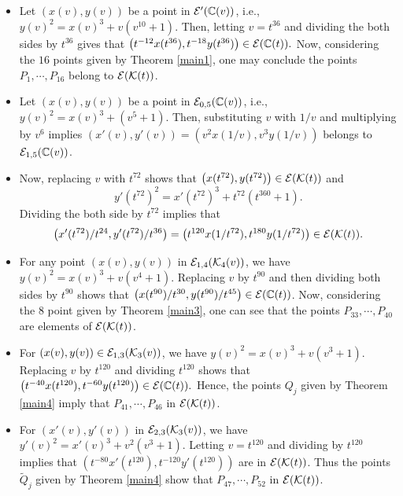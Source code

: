 \documentclass[11pt]{amsart}
\begin{document}
\begin{itemize}
	\item[(1)] Let $(x(v), y(v))$ be a point in ${\mathcal E}'({\mathbb C}(v))$, i.e.,
	$ y(v)^2=x(v)^3+ v (v^{10}+1)$. 
	Then, letting $v=t^{36}$ and dividing the both sides by $t^{36}$ gives that
	$\left( t^{-12} x(t^{36}), t^{-18} y(t^{36}) \right) \in {\mathcal E} ({\mathbb C}(t)).$
	Now, considering the $16$ points given by Theorem \ref{main1}, one may conclude 
	the points $P_1, \cdots, P_{16}$ belong to ${\mathcal E}({\mathcal K}(t))$.
	
	
	
	\item[(2)] Let $(x(v), y(v))$ be a point in ${\mathcal E}_{0,5}({\mathbb C}(v))$, i.e.,
	$ y(v)^2=x(v)^3+  (v^5+1)$. Then, substituting $v$ with $1/v$ and multiplying  by $v^6$ implies $\left(x'(v), y'(v)\right) = (v^2 x(1/v), v^3 y(1/v))$ belongs to 
	$ {\mathcal E}_{1, 5}({\mathbb C}(v))$.
	
	\item[(3)]	
	Now, replacing $v$ with $t^{72}$ shows that
	$\left( x(t^{72}), y(t^{72}) \right) \in {\mathcal E}({\mathcal K}(t))$ and
	$$  y'(t^{72})^2=x'(t^{72})^3+ t^{72} (t^{360}+1).$$
	Dividing the both side by $t^{72}$ implies that  
	$$\left(x'(t^{72})/t^{24}, y'(t^{72})/t^{36}\right)= \left( t^{120} x(1/t^{72}),  t^{180} y(1/t^{72})\right) \in {\mathcal E} ({\mathcal K}(t)).$$
	
	
	
	
	
	\item[(4)] For any point $(x(v), y(v))$  in ${\mathcal E}_{1, 4}({\mathcal K}_4(v))$, we have 
	$ y(v)^2=x(v)^3+  v (v^4+1)$. Replacing $v$ by $t^{90}$ and then dividing both sides by $t^{90}$ shows that  $\left(x(t^{90})/t^{30}, y(t^{90})/t^{45}\right) \in {\mathcal E} ({\mathbb C}(t))$.
	Now, considering the $8$ point given by Theorem \ref{main3}, one can see that 
	the points $P_{33}, \cdots, P_{40}$  are elements of   ${\mathcal E}({\mathcal K}(t))$.
	
	
	\item[(5)]  For $(x(v), y(v)) \in {\mathcal E}_{1, 3} ({\mathcal K}_3(v))$, 
	we have $ y(v)^2=x(v)^3+  v (v^3+1)$.
	Replacing $v$ by $t^{120}$ and dividing $t^{120}$ shows that
	$\left( t^{-40} x(t^{120}), t^{-60} y(t^{120})\right) \in  {\mathcal E} ({\mathbb C}(t)).$ 
	Hence, the points $Q_j $  given by Theorem \ref{main4}  imply that
	$P_{41},\cdots, P_{46}$ in   ${\mathcal E}({\mathcal K}(t))$. 
	
	\item[(6)]	
	For	$(x'(v),y'(v))$ in $ {\mathcal E}_{2, 3}({\mathcal K}_3(v))$, we have   $ y'(v)^2=x'(v)^3+  v^2 (v^3+1)$.
	Letting $v=t^{120}$ and dividing by $t^{120}$ implies  that	$\left( t^{-80} x'(t^{120}), t^{-120}y'(t^{120})\right)$
	are in  ${\mathcal E}({\mathcal K}(t))$. Thus the points $\widetilde{Q}_j$  given by Theorem \ref{main4}
	show that  $P_{47},\cdots, P_{52}$ in   ${\mathcal E}({\mathcal K}(t))$.
	

\end{itemize}
\end{document}
